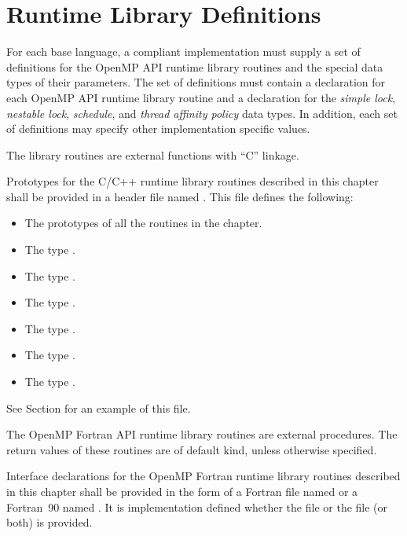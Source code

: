 \section{Runtime Library Definitions}
\label{sec:runtime library definitions}
For each base language, a compliant implementation must supply a set of definitions for 
the OpenMP API runtime library routines and the special data types of their parameters. 
The set of definitions must contain a declaration for each OpenMP API runtime library 
routine and a declaration for the \emph{simple lock}, \emph{nestable lock}, \emph{schedule}, and \emph{thread affinity
policy} data types. In addition, each set of definitions may specify other implementation 
specific values.

\ccppspecificstart
The library routines are external functions with ``C'' linkage.

Prototypes for the C/C++ runtime library routines described in this chapter shall be 
provided in a header file named . This file defines the following: 

\begin{itemize}
\item The prototypes of all the routines in the chapter. 

\item The type . 

\item The type .

\item The type . 

\item The type .

\item The type .

\item The type .

\end{itemize}

See Section  for an example of this file.
\ccppspecificend

\fortranspecificstart
The OpenMP Fortran API runtime library routines are external procedures. The return 
values of these routines are of default kind, unless otherwise specified.

Interface declarations for the OpenMP Fortran runtime library routines described in this 
chapter shall be provided in the form of a Fortran  file named  or 
a Fortran~90  named . It is implementation defined whether the 
 file or the  file (or both) is provided.

